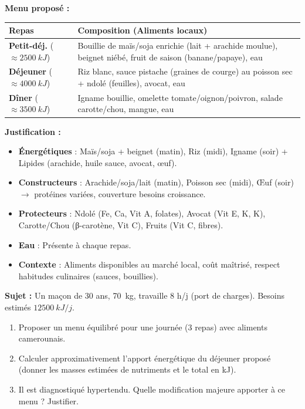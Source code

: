 \documentclass[11pt]{article}
\begin{document}
\begin{exoresolu}
\tcblower
\textbf{Menu proposé :}
\begin{center}
\begin{tabularx}{\linewidth}{|l|X|}
\hline
\rowcolor{popblueL} \textbf{Repas} & \textbf{Composition (Aliments locaux)} \\
\hline
\textbf{Petit-déj.} ($\approx \SI{2500}{kJ}$) & Bouillie de maïs/soja enrichie (lait + arachide moulue), beignet niébé, fruit de saison (banane/papaye), eau \\
\hline
\textbf{Déjeuner} ($\approx \SI{4000}{kJ}$) & Riz blanc, sauce pistache (graines de courge) au poisson sec + ndolé (feuilles), avocat, eau \\
\hline
\textbf{Dîner} ($\approx \SI{3500}{kJ}$) & Igname bouillie, omelette tomate/oignon/poivron, salade carotte/chou, mangue, eau \\
\hline
\end{tabularx}
\end{center}
\textbf{Justification :}
\begin{itemize}
\item \textbf{Énergétiques} : Maïs/soja + beignet (matin), Riz (midi), Igname (soir) + Lipides (arachide, huile sauce, avocat, œuf).
\item \textbf{Constructeurs} : Arachide/soja/lait (matin), Poisson sec (midi), Œuf (soir) $\rightarrow$ protéines variées, couverture besoins croissance.
\item \textbf{Protecteurs} : Ndolé (Fe, Ca, Vit A, folates), Avocat (Vit E, K, K), Carotte/Chou (β-carotène, Vit C), Fruits (Vit C, fibres).
\item \textbf{Eau} : Présente à chaque repas.
\item \textbf{Contexte} : Aliments disponibles au marché local, coût maîtrisé, respect habitudes culinaires (sauces, bouillies).
\end{itemize}
\end{exoresolu}

\begin{exercice}
\textbf{Sujet :} Un maçon de 30 ans, \SI{70}{kg}, travaille 8 h/j (port de charges). Besoins estimés $\SI{12500}{kJ/j}$.
\begin{enumerate}
\item Proposer un menu équilibré pour une journée (3 repas) avec aliments camerounais.
\item Calculer approximativement l'apport énergétique du déjeuner proposé (donner les masses estimées de nutriments et le total en kJ).
\item Il est diagnostiqué hypertendu. Quelle modification majeure apporter à ce menu ? Justifier.
\end{enumerate}
\end{exercice}
\end{document}
